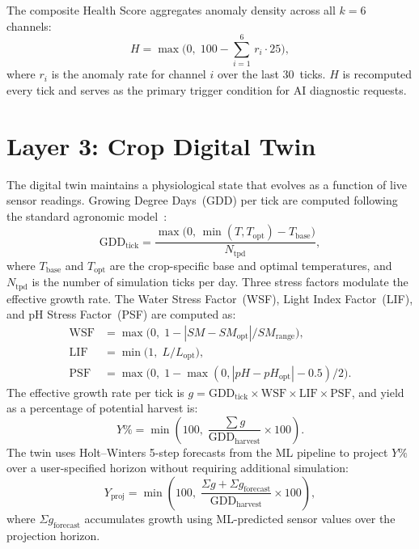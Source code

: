 \documentclass[journal,10pt,twocolumn]{IEEEtran}
\begin{document}
The composite Health Score aggregates anomaly density across all $k{=}6$
channels:
\begin{equation}
  H = \max\!\bigl(0,\;100 - \textstyle\sum_{i=1}^{6}\,r_i \cdot 25\bigr),
  \label{eq:health}
\end{equation}
where $r_i$ is the anomaly rate for channel $i$ over the last
30~ticks. $H$ is recomputed every tick and serves as the primary
trigger condition for AI diagnostic requests.

\section{Layer 3: Crop Digital Twin}
\label{sec:twin}

The digital twin maintains a physiological state that evolves as a
function of live sensor readings.
Growing Degree Days~(GDD) per tick are computed following the standard
agronomic model~\cite{McMaster1997}:
\begin{equation}
  \mathrm{GDD}_{\mathrm{tick}} =
    \frac{\max\!\bigl(0,\,\min(T, T_{\mathrm{opt}}) - T_{\mathrm{base}}\bigr)}
         {N_{\mathrm{tpd}}},
  \label{eq:gdd}
\end{equation}
where $T_{\mathrm{base}}$ and $T_{\mathrm{opt}}$ are the crop-specific
base and optimal temperatures, and $N_{\mathrm{tpd}}$ is the number of
simulation ticks per day.
Three stress factors modulate the effective growth rate.
The Water Stress Factor~(WSF), Light Index Factor~(LIF), and pH Stress
Factor~(PSF) are computed as:
\begin{align}
  \mathrm{WSF} &= \max\!\bigl(0,\;1 - |SM - SM_{\mathrm{opt}}|/SM_{\mathrm{range}}\bigr),
  \label{eq:wsf}\\
  \mathrm{LIF} &= \min\!\bigl(1,\;L/L_{\mathrm{opt}}\bigr),
  \label{eq:lif}\\
  \mathrm{PSF} &= \max\!\bigl(0,\;1 - \max(0,|pH - pH_{\mathrm{opt}}| - 0.5)/2\bigr).
  \label{eq:psf}
\end{align}
The effective growth rate per tick is
$g = \mathrm{GDD}_{\mathrm{tick}}\times\mathrm{WSF}\times\mathrm{LIF}\times\mathrm{PSF}$,
and yield as a percentage of potential harvest is:
\begin{equation}
  Y\% = \min\!\left(100,\;\frac{\sum g}{\mathrm{GDD}_{\mathrm{harvest}}} \times 100\right).
  \label{eq:yield}
\end{equation}
The twin uses Holt--Winters 5-step forecasts from the ML pipeline to
project $Y\%$ over a user-specified horizon without requiring
additional simulation:
\begin{equation}
  Y_{\mathrm{proj}} = \min\!\left(100,\;
    \frac{\Sigma g + \Sigma g_{\mathrm{forecast}}}{\mathrm{GDD}_{\mathrm{harvest}}}
    \times 100\right),
  \label{eq:yield_proj}
\end{equation}
where $\Sigma g_{\mathrm{forecast}}$ accumulates growth using
ML-predicted sensor values over the projection horizon.
\end{document}
